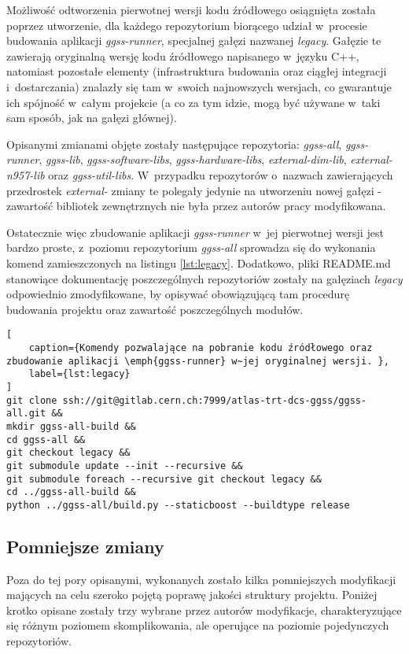 Możliwość odtworzenia pierwotnej wersji kodu źródłowego osiągnięta została poprzez utworzenie, dla każdego repozytorium biorącego udział w~procesie budowania aplikacji \emph{ggss-runner}, specjalnej gałęzi nazwanej \emph{legacy}. Gałęzie te zawierają oryginalną wersję kodu źródłowego napisanego w~języku C++, natomiast pozostałe elementy (infrastruktura budowania oraz ciągłej integracji i~dostarczania) znalazły się tam w~swoich najnowszych wersjach, co gwarantuje ich spójność w~całym projekcie (a co za tym idzie, mogą być używane w~taki sam sposób, jak na gałęzi głównej).

Opisanymi zmianami objęte zostały następujące repozytoria: \emph{ggss-all}, \emph{ggss-runner}, \emph{ggss-lib}, \emph{ggss-software-libs}, \emph{ggss-hardware-libs}, \emph{external-dim-lib}, \emph{external-n957-lib} oraz \emph{ggss-util-libs}. W~przypadku repozytorów o~nazwach zawierających przedrostek \emph{external-} zmiany te polegały jedynie na utworzeniu nowej gałęzi - zawartość bibliotek zewnętrznych nie była przez autorów pracy modyfikowana.

Ostatecznie więc zbudowanie aplikacji \emph{ggss-runner} w~jej pierwotnej wersji jest bardzo proste, z~poziomu repozytorium \emph{ggss-all} sprowadza się do wykonania komend zamieszczonych na listingu \ref{lst:legacy}. Dodatkowo, pliki README.md stanowiące dokumentację poszczególnych repozytoriów zostały na gałęziach \emph{legacy} odpowiednio zmodyfikowane, by opisywać obowiązującą tam procedurę budowania projektu oraz zawartość poszczególnych modułów.

\begin{lstlisting}[
    caption={Komendy pozwalające na pobranie kodu źródłowego oraz zbudowanie aplikacji \emph{ggss-runner} w~jej oryginalnej wersji. },
    label={lst:legacy}
]
git clone ssh://git@gitlab.cern.ch:7999/atlas-trt-dcs-ggss/ggss-all.git &&
mkdir ggss-all-build &&
cd ggss-all &&
git checkout legacy &&
git submodule update --init --recursive &&
git submodule foreach --recursive git checkout legacy &&
cd ../ggss-all-build &&
python ../ggss-all/build.py --staticboost --buildtype release
\end{lstlisting}

\subsection{Pomniejsze zmiany}
Poza do tej pory opisanymi, wykonanych zostało kilka pomniejszych modyfikacji mających na celu szeroko pojętą poprawę jakości struktury projektu. Poniżej krotko opisane zostały trzy wybrane przez autorów modyfikacje, charakteryzujące się różnym poziomem skomplikowania, ale operujące na poziomie pojedynczych repozytoriów. 

